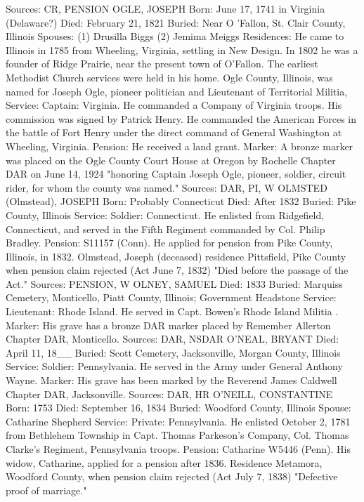 Sources: CR, PENSION 
OGLE, JOSEPH 
Born: June 17, 1741 in Virginia (Delaware?) 
Died: February 21, 1821 
Buried: Near O 'Fallon, St. Clair County, Illinois 
Spouses: (1) Drusilla Biggs
	 (2) Jemima Meiggs 
Residences: He came to Illinois in 1785 from Wheeling, Virginia, settling in New Design. In 1802 he was a founder of Ridge Prairie, near the present town of O'Fallon. The earliest Methodist Church services were held in his home. Ogle County, Illinois, was named for Joseph Ogle, pioneer politician and Lieutenant of Territorial Militia, 
Service: Captain: Virginia. He commanded a Company of Virginia troops. His commission was signed by Patrick Henry. He commanded the American Forces in the battle of Fort Henry under the direct command of General Washington at Wheeling, Virginia. 
Pension: He received a land grant. 
Marker: A bronze marker was placed on the Ogle County Court House at Oregon by Rochelle Chapter DAR on June 14, 1924 "honoring Captain Joseph Ogle, pioneer, soldier, circuit rider, for whom the county was named." 
Sources: DAR, PI, W 
OLMSTED (Olmstead), JOSEPH 
Born: Probably Connecticut
Died: After 1832 
Buried: Pike County, Illinois 
Service: Soldier: Connecticut. He enlisted from Ridgefield, Connecticut, and served in the Fifth Regiment commanded by Col. Philip Bradley. 
Pension: S11157 (Conn). He applied for pension from Pike County, Illinois, in 1832. Olmstead, Joseph (deceased) residence Pittsfield, Pike County when pension claim rejected (Act June 7, 1832) "Died before the passage of the Act." 
Sources: PENSION, W 
OLNEY, SAMUEL 
Died: 1833 
Buried: Marquiss Cemetery, Monticello, Piatt County, Illinois; Government Head­stone 
Service: Lieutenant: Rhode Island. He served in Capt. Bowen's Rhode Island Militia .
Marker: His grave has a bronze DAR marker placed by Remember Allerton Chapter DAR, Monticello. 
Sources: DAR, NSDAR 
O'NEAL, BRYANT 
Died: April 11, 18__ 
Buried: Scott Cemetery, Jacksonville, Morgan County, Illinois 
Service: Soldier: Pennsylvania. He served in the Army under General Anthony Wayne.
Marker: His grave has been marked by the Reverend James Caldwell Chapter DAR, Jacksonville. 
Sources: DAR, HR 
O'NEILL, CONSTANTINE
Born: 1753
Died: September 16, 1834 
Buried: Woodford County, Illinois 
Spouse: Catharine Shepherd 
Service: Private: Pennsylvania. He enlisted October 2, 1781 from Bethlehem Township in Capt. Thomas Parkeson's Company, Col. Thomas Clarke's Regiment, Pennsylvania troops. Pension: Catharine W5446 (Penn). His widow, Catharine, applied for a pension after 1836. Residence Metamora, Woodford County, when pension claim re­jected (Act July 7, 1838) "Defective proof of marriage." 
